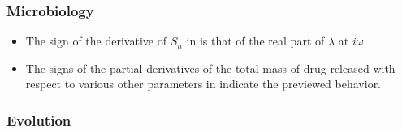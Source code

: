 \documentclass[11pt]{book}
\begin{document}
\subsubsection{Microbiology}
\begin{itemize}
\item The sign of the derivative of $S_{n}$ in \cite{beretta2003effect}
is that of the real part of $\lambda$ at $i\omega$.
\item The signs of the partial derivatives of the total mass of drug released
with respect to various other parameters in \cite{bernardes2019fighting}
indicate the previewed behavior.
\end{itemize}
\subsubsection{Evolution}
\end{document}
